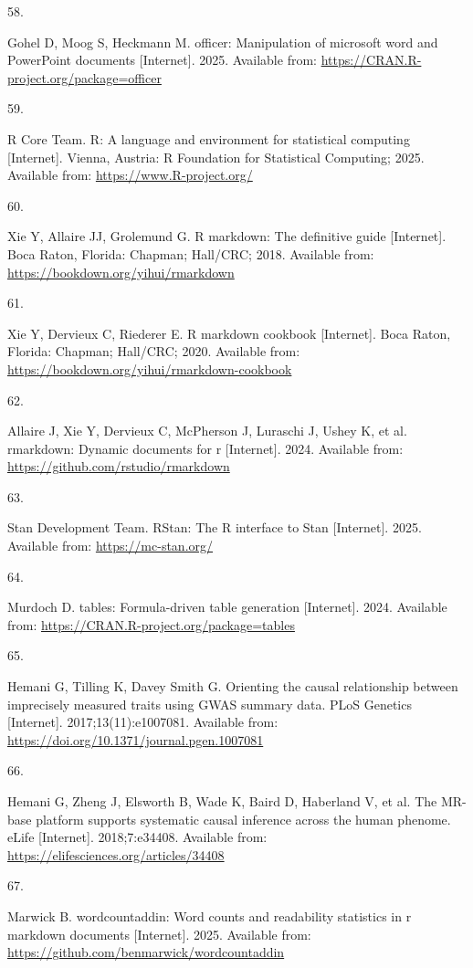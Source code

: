 \documentclass[
]{article}
\newlength{\cslhangindent}
\newlength{\csllabelwidth}
\newenvironment{CSLReferences}[2] %
 {\begin{list}{}{%
  \setlength{\itemindent}{0pt}
  \setlength{\leftmargin}{0pt}
  \setlength{\parsep}{0pt}
  \ifodd #1
   \setlength{\leftmargin}{\cslhangindent}
   \setlength{\itemindent}{-1\cslhangindent}
  \fi
  \setlength{\itemsep}{#2\baselineskip}}}
 {\end{list}}
\newcommand{\CSLLeftMargin}[1]{\parbox[t]{\csllabelwidth}{\strut#1\strut}}
\newcommand{\CSLRightInline}[1]{\parbox[t]{\linewidth - \csllabelwidth}{\strut#1\strut}}
\begin{document}
\begin{CSLReferences}{0}{1}
\CSLLeftMargin{58. }%
\CSLRightInline{Gohel D, Moog S, Heckmann M. {officer}: Manipulation of microsoft word and PowerPoint documents {[}Internet{]}. 2025. Available from: \url{https://CRAN.R-project.org/package=officer}}

\CSLLeftMargin{59. }%
\CSLRightInline{R Core Team. {R}: A language and environment for statistical computing {[}Internet{]}. Vienna, Austria: R Foundation for Statistical Computing; 2025. Available from: \url{https://www.R-project.org/}}

\CSLLeftMargin{60. }%
\CSLRightInline{Xie Y, Allaire JJ, Grolemund G. R markdown: The definitive guide {[}Internet{]}. Boca Raton, Florida: Chapman; Hall/CRC; 2018. Available from: \url{https://bookdown.org/yihui/rmarkdown}}

\CSLLeftMargin{61. }%
\CSLRightInline{Xie Y, Dervieux C, Riederer E. R markdown cookbook {[}Internet{]}. Boca Raton, Florida: Chapman; Hall/CRC; 2020. Available from: \url{https://bookdown.org/yihui/rmarkdown-cookbook}}

\CSLLeftMargin{62. }%
\CSLRightInline{Allaire J, Xie Y, Dervieux C, McPherson J, Luraschi J, Ushey K, et al. {rmarkdown}: Dynamic documents for r {[}Internet{]}. 2024. Available from: \url{https://github.com/rstudio/rmarkdown}}

\CSLLeftMargin{63. }%
\CSLRightInline{Stan Development Team. {RStan}: The {R} interface to {Stan} {[}Internet{]}. 2025. Available from: \url{https://mc-stan.org/}}

\CSLLeftMargin{64. }%
\CSLRightInline{Murdoch D. {tables}: Formula-driven table generation {[}Internet{]}. 2024. Available from: \url{https://CRAN.R-project.org/package=tables}}

\CSLLeftMargin{65. }%
\CSLRightInline{Hemani G, Tilling K, Davey Smith G. Orienting the causal relationship between imprecisely measured traits using GWAS summary data. PLoS Genetics {[}Internet{]}. 2017;13(11):e1007081. Available from: \url{https://doi.org/10.1371/journal.pgen.1007081}}

\CSLLeftMargin{66. }%
\CSLRightInline{Hemani G, Zheng J, Elsworth B, Wade K, Baird D, Haberland V, et al. The MR-base platform supports systematic causal inference across the human phenome. eLife {[}Internet{]}. 2018;7:e34408. Available from: \url{https://elifesciences.org/articles/34408}}

\CSLLeftMargin{67. }%
\CSLRightInline{Marwick B. {wordcountaddin}: Word counts and readability statistics in r markdown documents {[}Internet{]}. 2025. Available from: \url{https://github.com/benmarwick/wordcountaddin}}

\end{CSLReferences}
\end{document}
